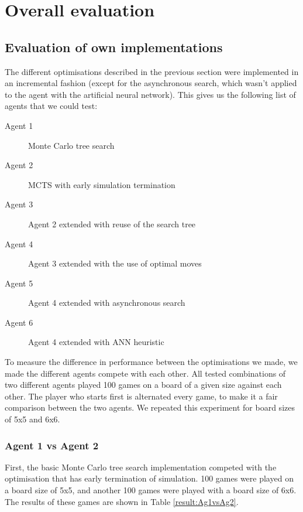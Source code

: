 \section{Overall evaluation}

\subsection{Evaluation of own implementations}
The different optimisations described in the previous section were implemented in an incremental fashion (except for the asynchronous search, which wasn't applied to the agent with the artificial neural network). This gives us the following list of agents that we could test:
\begin{description}
	\item[Agent 1] Monte Carlo tree search
	\item[Agent 2] MCTS with early simulation termination
	\item[Agent 3] Agent 2 extended with reuse of the search tree
	\item[Agent 4] Agent 3 extended with the use of optimal moves
	\item[Agent 5] Agent 4 extended with asynchronous search
	\item[Agent 6] Agent 4 extended with ANN heuristic
\end{description}

To measure the difference in performance between the optimisations we made, we made the different agents compete with each other. All tested combinations of two different agents played 100 games on a board of a given size against each other. The player who starts first is alternated every game, to make it a fair comparison between the two agents.
We repeated this experiment for board sizes of 5x5 and 6x6.

\subsubsection{Agent 1 vs Agent 2}
First, the basic Monte Carlo tree search implementation competed with the optimisation that has early termination of simulation. 100 games were played on a board size of 5x5, and another 100 games were played with a board size of 6x6. The results of these games are shown in Table \ref{result:Ag1vsAg2}.

